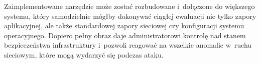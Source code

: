 \documentclass[12pt,a4paper,polish,thesis]{dcsbook}
\begin{document}
Zaimplementowane narzędzie może zostać rozbudowane i~dołączone do większego systemu, który samodzielnie mógłby dokonywać ciągłej ewaluacji nie tylko zapory aplikacyjnej, ale także standardowej zapory sieciowej czy konfiguracji systemu operacyjnego. Dopiero pełny obraz daje administratorowi kontrolę nad stanem bezpieczeństwa infrastruktury i~pozwoli reagować na wszelkie anomalie w~ruchu sieciowym, które mogą wydarzyć się podczas ataku.

\appendix

\backmatter
\end{document}
